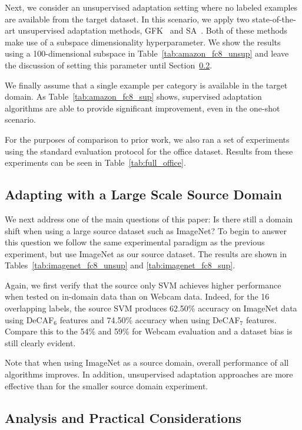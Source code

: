 Next, we consider an unsupervised adaptation setting where no labeled examples are available from the target dataset. In this scenario, we apply two state-of-the-art unsupervised adaptation methods, GFK~\cite{gong-cvpr12} and SA~\cite{sa}. 
Both of these methods make use of a subspace dimensionality hyperparameter.
We show the results using a 100-dimensional subspace in Table~\ref{tab:amazon_fc8_unsup} and leave the discussion of setting this parameter until Section~\ref{sec:analysis}.

We finally assume that a single example per category is available in the target domain.
As Table~\ref{tab:amazon_fc8_sup} shows, supervised adaptation algorithms are able to provide significant improvement, even in the one-shot scenario. %



For the purposes of comparison to prior work, we also ran a set of experiments
using the standard evaluation protocol for the office dataset.  Results from these experiments can be seen in
Table~\ref{tab:full_office}.


\subsection{Adapting with a Large Scale Source Domain}

We next address one of the main questions of this paper: Is there still a domain shift when using a large source dataset such as ImageNet? To begin to answer this question we follow the same experimental paradigm as the previous experiment, but use ImageNet as our source dataset. 
The results are shown in Tables~\ref{tab:imagenet_fc8_unsup} and \ref{tab:imagenet_fc8_sup}. %



Again, we first verify that the source only SVM achieves higher performance when tested on in-domain data than on Webcam data. 
Indeed, for the 16 overlapping labels, the source SVM produces 62.50\% accuracy on ImageNet data using DeCAF$_6$ features and 74.50\% accuracy when using DeCAF$_7$ features. 
Compare this to the 54\% and 59\% for Webcam evaluation and a dataset bias is still clearly evident.

Note that when using ImageNet as a source domain, overall performance of all algorithms improves. In addition, unsupervised adaptation approaches are more effective than for the smaller source domain experiment. 

\subsection{Analysis and Practical Considerations}
\label{sec:analysis}




